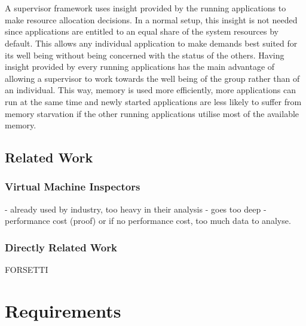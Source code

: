 \documentclass{l4proj}
\begin{document}
\\\\
\hspace*{3em} A supervisor framework uses insight provided by the running applications to make resource allocation decisions. In a normal setup, this insight is not needed since applications are entitled to an equal share of the system resources by default. This allows any individual application to make demands best suited for its well being without being concerned with the status of the others. Having insight provided by every running applications has the main advantage of allowing a supervisor to work towards the well being of the group rather than of an individual. This way, memory is used more efficiently, more applications can run at the same time and newly started applications are less likely to suffer from memory starvation if the other running applications utilise most of the available memory.
\section{Related Work}
\subsection{Virtual Machine Inspectors}
\hspace*{3em} - already used by industry, too heavy in their analysis - goes too deep - performance cost (proof) or if no performance cost, too much data to analyse.
\subsection{Directly Related Work}
FORSETTI
\chapter{Requirements}
\end{document}
